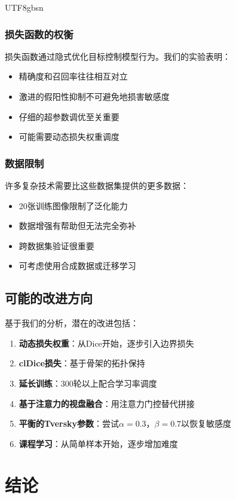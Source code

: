 \documentclass[conference]{IEEEtran}
\begin{document}
\begin{CJK}{UTF8}{gbsn}
\subsubsection{损失函数的权衡}
损失函数通过隐式优化目标控制模型行为。我们的实验表明：
\begin{itemize}
    \item 精确度和召回率往往相互对立
    \item 激进的假阳性抑制不可避免地损害敏感度
    \item 仔细的超参数调优至关重要
    \item 可能需要动态损失权重调度
\end{itemize}

\subsubsection{数据限制}
许多复杂技术需要比这些数据集提供的更多数据：
\begin{itemize}
    \item 20张训练图像限制了泛化能力
    \item 数据增强有帮助但无法完全弥补
    \item 跨数据集验证很重要
    \item 可考虑使用合成数据或迁移学习
\end{itemize}

\subsection{可能的改进方向}

基于我们的分析，潜在的改进包括：
\begin{enumerate}
    \item \textbf{动态损失权重}：从Dice开始，逐步引入边界损失
    \item \textbf{clDice损失}：基于骨架的拓扑保持\cite{shit2021cldice}
    \item \textbf{延长训练}：300轮以上配合学习率调度
    \item \textbf{基于注意力的视盘融合}：用注意力门控替代拼接
    \item \textbf{平衡的Tversky参数}：尝试$\alpha=0.3$，$\beta=0.7$以恢复敏感度
    \item \textbf{课程学习}：从简单样本开始，逐步增加难度
\end{enumerate}

\section{结论}


\end{CJK}
\end{document}
